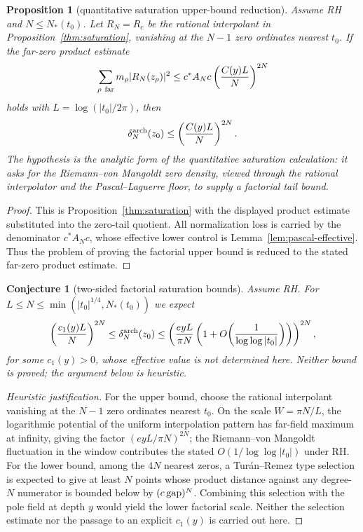 \documentclass[11pt]{amsart}
\newtheorem{proposition}[theorem]{Proposition}
\newtheorem{conjecture}[theorem]{Conjecture}
\theoremstyle{definition}
\theoremstyle{remark}
\theoremstyle{definition}
\begin{document}
\begin{proposition}[quantitative saturation upper-bound reduction]\label{thm:sat-quant}
Assume RH and $N\le N_*(t_0)$.  Let $R_N=R_c$ be the rational interpolant in
Proposition~\ref{thm:saturation}, vanishing at the
$N-1$ zero ordinates nearest $t_0$.  If the far-zero product estimate
\[
   \sum_{\rho\ {\rm far}}m_\rho |R_N(z_\rho)|^2
   \le
   c^*A_Nc\left(\frac{C(y)L}{N}\right)^{2N}
\]
holds with $L=\log(|t_0|/2\pi)$, then
\[
   \delta_N^{\rm arch}(z_0)\le\left(\frac{C(y)L}{N}\right)^{2N}.
\]
The hypothesis is the analytic form of the quantitative saturation calculation: it asks
for the Riemann--von Mangoldt zero density, viewed through the rational interpolator and the
Pascal--Laguerre floor, to supply a factorial tail bound.
\end{proposition}

\begin{proof}
This is Proposition~\ref{thm:saturation} with the displayed product estimate substituted into the
zero-tail quotient.  All normalization loss is carried by the denominator $c^*A_Nc$, whose effective
lower control is Lemma~\ref{lem:pascal-effective}.  Thus the problem of proving the factorial upper
bound is reduced to the stated far-zero product estimate.
\end{proof}

\begin{conjecture}[two-sided factorial saturation bounds]\label{thm:two-sided}
Assume RH.  For $L\le N\le\min(|t_0|^{1/4},N_*(t_0))$ we expect
\[
   \left(\frac{c_1(y)L}{N}\right)^{2N}
   \le
   \delta_N^{\rm arch}(z_0)
   \le
   \left(
      \frac{eyL}{\pi N}
      \left(1+O\!\left(\frac1{\log\log |t_0|}\right)\right)
   \right)^{2N},
\]
for some $c_1(y)>0$, whose effective value is not determined here.  Neither bound is proved; the
argument below is heuristic.
\end{conjecture}

\begin{proof}[Heuristic justification]
For the upper bound, choose the rational interpolant vanishing at the $N-1$ zero ordinates nearest
$t_0$.  On the scale $W=\pi N/L$, the logarithmic potential of the uniform interpolation pattern has
far-field maximum at infinity, giving the factor $(eyL/\pi N)^{2N}$; the Riemann--von Mangoldt
fluctuation in the window contributes the stated $O(1/\log\log |t_0|)$ under RH.  For the lower bound,
among the $4N$ nearest zeros, a Tur\'an--Remez type selection is expected to give at least $N$ points whose product distance
against any degree-$N$ numerator is bounded below by $(c\,{\rm gap})^N$.  Combining this selection with
the pole field at depth $y$ would yield the lower factorial scale.  Neither the selection estimate
nor the passage to an explicit $c_1(y)$ is carried out here.
\end{proof}
\end{document}
